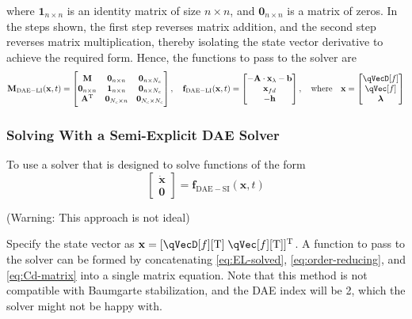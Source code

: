 \documentclass[11pt]{article}
\begin{document}
where $\mathbf{1}_{n\times n}$ is an identity matrix of size $n\times n$, and $\mathbf{0}_{n\times n}$ is a matrix of zeros. In the steps shown, the first step reverses matrix addition, and the second step reverses matrix multiplication, thereby isolating the state vector derivative to achieve the required form. Hence, the functions to pass to the solver are
\begin{equation}
    \mathbf{M}_{\mathrm{DAE-LI}}(\mathbf{x},t) =
    \begin{bmatrix}
        \mathbf{M} & \mathbf{0}_{n\times n} & \mathbf{0}_{n\times N_c} \\
        \mathbf{0}_{n\times n} & \mathbf{1}_{n\times n} & \mathbf{0}_{n\times N_c} \\
        \mathbf{A}^{\mathrm{T}} & \mathbf{0}_{N_c\times n} & \mathbf{0}_{N_c\times N_c}
    \end{bmatrix}
    ,\quad
    \mathbf{f}_{\mathrm{DAE-LI}}(\mathbf{x},t) =
    \begin{bmatrix}
        - \mathbf{A} \cdot \mathbf{x}_{\lambda} - \mathbf{b} \\
        \mathbf{x}_{fd} \\
        - \mathbf{h}
    \end{bmatrix}
    ,\quad \mathrm{where} \quad
    \mathbf{x} = \begin{bmatrix} \qVecD[f] \\ \qVec[f] \\ \bm{\lambda} \end{bmatrix}
\end{equation}


\subsubsection{Solving With a Semi-Explicit DAE Solver} \label{sssec:d:fwdDyn:DAE-semi-explicit}
To use a solver that is designed to solve functions of the form
\begin{equation}
    \begin{bmatrix}\dot{\mathbf{x}} \\ \mathbf{0} \end{bmatrix} = \mathbf{f}_{\mathrm{DAE-SI}}(\mathbf{x},t)
\end{equation}

(Warning: This approach is not ideal)

Specify the state vector as $\mathbf{x} = [\qVecD[f][\mathrm{T}] \; \qVec[f][\mathrm{T}]]^{\mathrm{T}}$. A function to pass to the solver can be formed by concatenating \eqref{eq:EL-solved}, \eqref{eq:order-reducing}, and \eqref{eq:Cd-matrix} into a single matrix equation. Note that this method is not compatible with Baumgarte stabilization, and the DAE index will be 2, which the solver might not be happy with.
\end{document}
